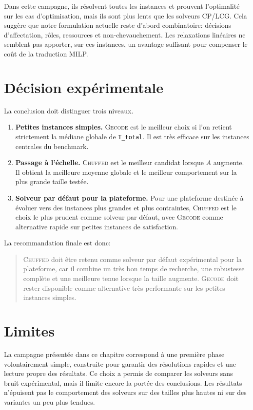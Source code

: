 \documentclass[12pt,a4paper]{article}
\newcommand{\solver}[1]{\textnormal{\textsc{#1}}}
\begin{document}
Dans cette campagne, ils résolvent toutes les instances et prouvent l'optimalité sur les cas d'optimisation, mais ils sont plus lents que les solveurs CP/LCG. Cela suggère que notre formulation actuelle reste d'abord combinatoire: décisions d'affectation, rôles, ressources et non-chevauchement. Les relaxations linéaires ne semblent pas apporter, sur ces instances, un avantage suffisant pour compenser le coût de la traduction MILP.

\section{Décision expérimentale}

La conclusion doit distinguer trois niveaux.

\begin{enumerate}
  \item \textbf{Petites instances simples.} \solver{Gecode} est le meilleur choix si l'on retient strictement la médiane globale de \texttt{T\_total}. Il est très efficace sur les instances centrales du benchmark.
  \item \textbf{Passage à l'échelle.} \solver{Chuffed} est le meilleur candidat lorsque $A$ augmente. Il obtient la meilleure moyenne globale et le meilleur comportement sur la plus grande taille testée.
  \item \textbf{Solveur par défaut pour la plateforme.} Pour une plateforme destinée à évoluer vers des instances plus grandes et plus contraintes, \solver{Chuffed} est le choix le plus prudent comme solveur par défaut, avec \solver{Gecode} comme alternative rapide sur petites instances de satisfaction.
\end{enumerate}

La recommandation finale est donc:

\begin{quote}
\solver{Chuffed} doit être retenu comme solveur par défaut expérimental pour la plateforme, car il combine un très bon temps de recherche, une robustesse complète et une meilleure tenue lorsque la taille augmente. \solver{Gecode} doit rester disponible comme alternative très performante sur les petites instances simples.
\end{quote}

\section{Limites}

La campagne présentée dans ce chapitre correspond à une première phase volontairement simple, construite pour garantir des résolutions rapides et une lecture propre des résultats. Ce choix a permis de comparer les solveurs sans bruit expérimental, mais il limite encore la portée des conclusions. Les résultats n'épuisent pas le comportement des solveurs sur des tailles plus hautes ni sur des variantes un peu plus tendues.
\end{document}
